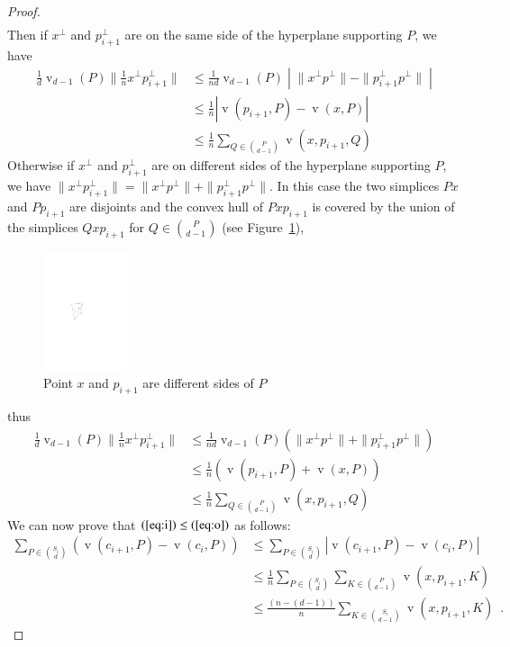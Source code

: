 \documentclass[preprint, 12pt]{elsarticle}
\DeclareMathOperator{\vol}{v}
\begin{document}
\begin{proof}
\[\begin{aligned}
  \end{aligned}
    \]
Then if $x^\perp$ and $p_{i+1}^{\perp}$ are on the same side of the hyperplane
supporting $P$, we have
\[  
  \begin{aligned}
   \frac{1}{d} \vol_{d-1}(P) \|\frac{1}{n}x^{\perp} p_{i+1}^{\perp}\| 
     &  \leq \frac{1}{nd} \vol_{d-1}(P) 
                     \;\left|\;\|x^{\perp}p^{\perp}\|-\|p_{i+1}^{\perp} p^{\perp}\|\;\right| \\
      & \leq\frac{1}{n} |\vol(p_{i+1},P)-\vol(x,P)|\\
  & \leq \frac{1}{n}\sum_{Q \in \binom{P}{d-1}} \vol(x,p_{i+1}, Q) 
  \end{aligned}
\]
Otherwise if $x^\perp$ and $p_{i+1}^{\perp}$ are on different
sides of the hyperplane supporting $P$, we have $\|x^{\perp}
p_{i+1}^{\perp}\|=\|x^{\perp}p^{\perp}\| +\|p_{i+1}^{\perp} p^{\perp}\|$.
In this case the two simplices $Px$ and $Pp_{i+1}$ are disjoints and
the convex hull of $Pxp_{i+1}$ is covered by the union of the simplices
$Qxp_{i+1}$ for $Q \in \binom{P}{d-1}$ (see Figure~\ref{fig:disjSimp}),
\begin{figure}[htb]
  \begin{center}
    \includegraphics[width=0.22\textwidth]{pics/disjointSimp.pdf}
  \end{center}
  \caption{Point $x$ and $p_{i+1}$ are different sides of $P$}
  \label{fig:disjSimp}
\end{figure}
thus
\[  
  \begin{aligned}
  \frac{1}{d} \vol_{d-1}(P) \|\frac{1}{n}x^{\perp} p_{i+1}^{\perp}\|  
     &  \leq \frac{1}{nd} \vol_{d-1}(P) (\|x^{\perp}p^{\perp}\|+\|p_{i+1}^{\perp} p^{\perp}\|) \\
      & \leq\frac{1}{n} ( \vol(p_{i+1},P)+\vol(x,P) )\\
  & \leq \frac{1}{n}\sum_{Q \in \binom{P}{d-1}} \vol(x,p_{i+1}, Q) 
 \end{aligned}
\]
We can now prove that $(\ref{eq:i})\leq(\ref{eq:o})$ as follows:
\[
  \begin{aligned}
  \sum_{P \in \binom{S_i}{d}} (\vol(c_{i+1}, P)- \vol(c_i,P))
 & \le \sum_{P \in \binom{S_i}{d}} |\vol(c_{i+1}, P)- \vol(c_i,P)| \\
 & \le \frac{1}{n} \sum_{P \in \binom{S_i}{d}} \sum_{K \in \binom{P}{d-1}} \vol(x,p_{i+1}, K) \\
  & \le \frac{(n-(d-1))}{n} \sum_{K \in \binom{S_i}{d-1}}  \vol(x,p_{i+1}, K) \enspace .
  \end{aligned}
\]



\end{proof}
\end{document}
